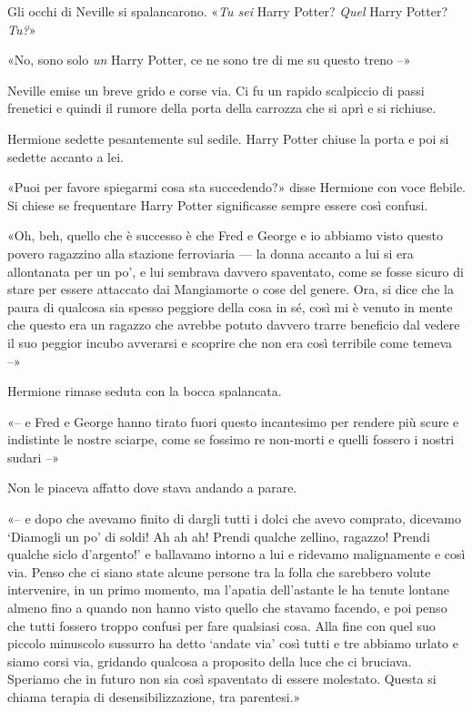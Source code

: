 Gli occhi di Neville si spalancarono. «\textit{Tu sei} Harry Potter? \textit{Quel} Harry Potter? \textit{Tu?}»

«No, sono solo \textit{un} Harry Potter, ce ne sono tre di me su questo treno –»

Neville emise un breve grido e corse via. Ci fu un rapido scalpiccio di passi frenetici e quindi il rumore della porta della carrozza che si aprì e si richiuse.

Hermione sedette pesantemente sul sedile. Harry Potter chiuse la porta e poi si sedette accanto a lei.

«Puoi per favore spiegarmi cosa sta succedendo?» disse Hermione con voce flebile. Si chiese se frequentare Harry Potter significasse sempre essere così confusi.

«Oh, beh, quello che è successo è che Fred e George e io abbiamo visto questo povero ragazzino alla stazione ferroviaria — la donna accanto a lui si era allontanata per un po’, e lui sembrava davvero spaventato, come se fosse sicuro di stare per essere attaccato dai Mangiamorte o cose del genere. Ora, si dice che la paura di qualcosa sia spesso peggiore della cosa in sé, così mi è venuto in mente che questo era un ragazzo che avrebbe potuto davvero trarre beneficio dal vedere il suo peggior incubo avverarsi e scoprire che non era così terribile come temeva –»

Hermione rimase seduta con la bocca spalancata.

«– e Fred e George hanno tirato fuori questo incantesimo per rendere più scure e indistinte le nostre sciarpe, come se fossimo re non-morti e quelli fossero i nostri sudari –»

Non le piaceva affatto dove stava andando a parare.

«– e dopo che avevamo finito di dargli tutti i dolci che avevo comprato, dicevamo ‘Diamogli un po’ di soldi! Ah ah ah! Prendi qualche zellino, ragazzo! Prendi qualche siclo d’argento!’ e ballavamo intorno a lui e ridevamo malignamente e così via. Penso che ci siano state alcune persone tra la folla che sarebbero volute intervenire, in un primo momento, ma l’apatia dell’astante le ha tenute lontane almeno fino a quando non hanno visto quello che stavamo facendo, e poi penso che tutti fossero troppo confusi per fare qualsiasi cosa. Alla fine con quel suo piccolo minuscolo sussurro ha detto ‘andate via’ così tutti e tre abbiamo urlato e siamo corsi via, gridando qualcosa a proposito della luce che ci bruciava. Speriamo che in futuro non sia così spaventato di essere molestato. Questa si chiama terapia di desensibilizzazione, tra parentesi.»

